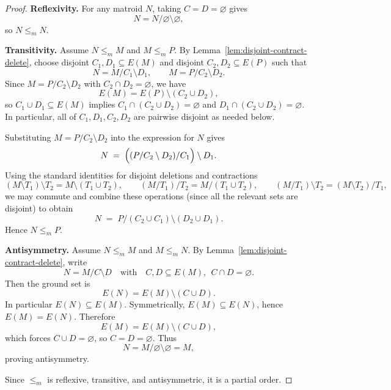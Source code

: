 \documentclass{article}
\begin{document}
\begin{proof}
\textbf{Reflexivity.}
For any matroid $N$, taking $C=D=\varnothing$ gives
\[
N = N/\varnothing \setminus \varnothing,
\]
so $N \le_m N$.

\medskip
\textbf{Transitivity.}
Assume $N \le_m M$ and $M \le_m P$.
By Lemma~\ref{lem:disjoint-contract-delete}, choose disjoint $C_1,D_1\subseteq E(M)$ and
disjoint $C_2,D_2\subseteq E(P)$ such that
\[
N = M/C_1 \setminus D_1,
\qquad
M = P/C_2 \setminus D_2.
\]
Since $M = P/C_2 \setminus D_2$ with $C_2\cap D_2=\varnothing$, we have
\[
E(M)=E(P)\setminus(C_2\cup D_2),
\]
so $C_1\cup D_1\subseteq E(M)$ implies $C_1\cap(C_2\cup D_2)=\varnothing$ and
$D_1\cap(C_2\cup D_2)=\varnothing$. In particular, all of $C_1,D_1,C_2,D_2$ are pairwise
disjoint as needed below.

Substituting $M = P/C_2\setminus D_2$ into the expression for $N$ gives
\[
N \;=\; \Bigl( (P/C_2\setminus D_2)/C_1 \Bigr)\setminus D_1.
\]
Using the standard identities for disjoint deletions and contractions
\[
(M\setminus T_1)\setminus T_2 = M\setminus (T_1\cup T_2),\qquad
(M/T_1)/T_2 = M/(T_1\cup T_2),\qquad
(M/T_1)\setminus T_2 = (M\setminus T_2)/T_1,
\]
we may commute and combine these operations (since all the relevant sets are disjoint) to obtain
\[
N \;=\; P/(C_2\cup C_1)\setminus (D_2\cup D_1).
\]
Hence $N \le_m P$.

\medskip
\textbf{Antisymmetry.}
Assume $N \le_m M$ and $M \le_m N$.
By Lemma~\ref{lem:disjoint-contract-delete}, write
\[
N = M/C \setminus D
\quad\text{with}\quad
C,D\subseteq E(M),\ \ C\cap D=\varnothing.
\]
Then the ground set is
\[
E(N)=E(M)\setminus(C\cup D).
\]
In particular $E(N)\subseteq E(M)$. Symmetrically, $E(M)\subseteq E(N)$, hence
$E(M)=E(N)$. Therefore
\[
E(M)=E(M)\setminus(C\cup D),
\]
which forces $C\cup D=\varnothing$, so $C=D=\varnothing$. Thus
\[
N = M/\varnothing\setminus\varnothing = M,
\]
proving antisymmetry.

Since $\le_m$ is reflexive, transitive, and antisymmetric, it is a partial order.
\end{proof}
\end{document}
